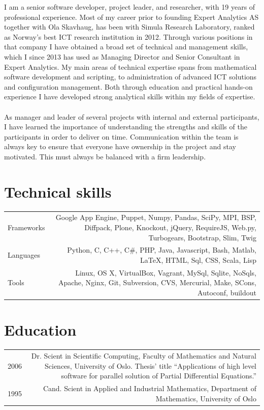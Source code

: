 \documentclass[english,a4paper,11pt]{article}
\begin{document}
I am a senior software developer, project leader, and researcher, with 19 years of professional experience. Most of my career prior to founding Expert Analytics AS together with Ola Skavhaug, has been with Simula Research Laboratory, ranked as Norway's best ICT research institution in 2012. Through various positions in that company I have obtained a broad set of technical and management skills, which I since 2013 has used as Managing Director and Senior Consultant in Expert Analytics. My main areas of technical expertise spans from mathematical software development and scripting, to administration of advanced ICT solutions and configuration management. Both through education and practical hands-on experience I have developed strong analytical skills within my fields of expertise. \\ \\ As manager and leader of several projects with internal and external participants, I have learned the importance of understanding the strengths and skills of the participants in order to deliver on time. Communication within the team is always key to ensure that everyone have ownership in the project and stay motivated. This must always be balanced with a firm leadership.\\
\section*{Technical skills}

\begin{tabular}{LR}
Frameworks & Google App Engine, Puppet, Numpy, Pandas, SciPy, MPI, BSP, Diffpack, Plone, Knockout, jQuery, RequireJS, Web.py, Turbogears, Bootstrap, Slim, Twig\\ 
Languages & Python, C, C++, C\#, PHP, Java, Javascript, Bash, Matlab, \LaTeX, HTML, Sql, CSS, Scala, Lisp\\ 
Tools & Linux, OS X, VirtualBox, Vagrant, MySql, Sqlite, NoSqls, Apache, Nginx, Git, Subversion, CVS, Mercurial, Make, SCons, Autoconf, buildout\\ 
\end{tabular}

\section*{Education}

\begin{tabular}{LR}
2006 & Dr. Scient in Scientific Computing, Faculty of Mathematics and Natural Sciences, University of Oslo. Thesis' title ``Applications of high level software for parallel solution of Partial Differential Equations.''\\ 
1995 & Cand. Scient in Applied and Industrial Mathematics, Department of Mathematics, University of Oslo\\ 
\end{tabular}
\end{document}
